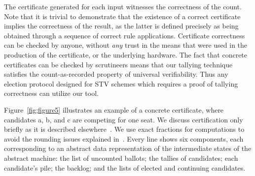 \documentclass{llncs}
\begin{document}
The certificate generated for each input witnesses 
the correctness of the
count. Note that it is trivial to demonstrate that the existence of
a correct certificate implies the correctness of the result, as the
latter is defined precisely as being obtained through a sequence of
correct rule applications. 
Certificate correctness can be checked by anyone, without \emph{any}
trust in the means that were used in the production of the
certificate, or the underlying hardware. 
The fact that concrete certificates can be checked by scrutineers
means that 
our tallying technique satisfies the
count-as-recorded property of universal verifiability. Thus any
election protocol designed for STV schemes which requires a proof of tallying correctness can utilize our tool.

 Figure~\ref{fig;figure5} illustrates an example of a concrete
 certificate, where candidates a, b, and c are competing for one
 seat. We discuss certification only briefly as it is described elsewhere~\cite{Ghale:2017:FVS}.
 We use exact fractions for
 computations to avoid the rounding issues explained
 in~\cite{DBLP:conf/voteid/GoreL16}.
 Every line shows six components, each 
 corresponding to an abstract data representation of the intermediate
 states of the abstract  machine: the 
 list of uncounted ballots; the tallies of candidates; each
 candidate's pile; the backlog; and the lists of elected and
 continuing candidates. 
 
\end{document}
